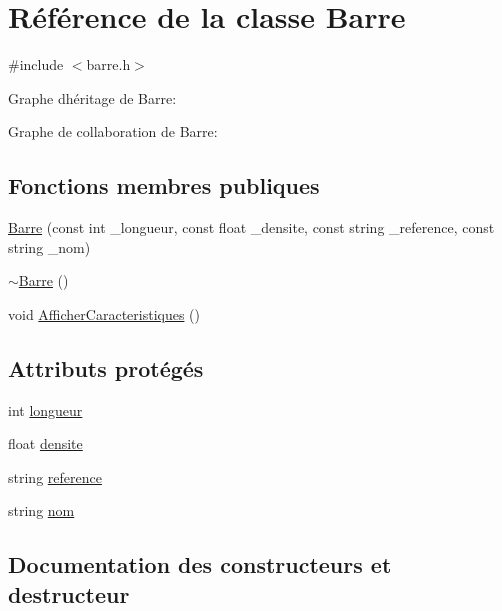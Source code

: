 \hypertarget{class_barre}{}\section{Référence de la classe Barre}
\label{class_barre}


{\ttfamily \#include $<$barre.\+h$>$}



Graphe d\textquotesingle{}héritage de Barre\+:


Graphe de collaboration de Barre\+:
\subsection*{Fonctions membres publiques}
\begin{DoxyCompactItemize}
\item 
\hyperlink{class_barre_a8d81d925e4b578b3eb32d28c69dc42fb}{Barre} (const int \+\_\+longueur, const float \+\_\+densite, const string \+\_\+reference, const string \+\_\+nom)
\item 
\hyperlink{class_barre_adc603c73952d56885cad1cc1acad578f}{$\sim$\+Barre} ()
\item 
void \hyperlink{class_barre_a2e844be9d7c76a74d61cb14243a1bade}{Afficher\+Caracteristiques} ()
\end{DoxyCompactItemize}
\subsection*{Attributs protégés}
\begin{DoxyCompactItemize}
\item 
int \hyperlink{class_barre_a59f5637eaf9c15084deafab15f0de07d}{longueur}
\item 
float \hyperlink{class_barre_a1ed969f61782b23802f20ff7a5759f8d}{densite}
\item 
string \hyperlink{class_barre_a787dda4b06eba9eac805fc67720d4a11}{reference}
\item 
string \hyperlink{class_barre_a28ab665131a097ea05e175e461375362}{nom}
\end{DoxyCompactItemize}


\subsection{Documentation des constructeurs et destructeur}
\mbox{\label{class_barre_a8d81d925e4b578b3eb32d28c69dc42fb}} 
